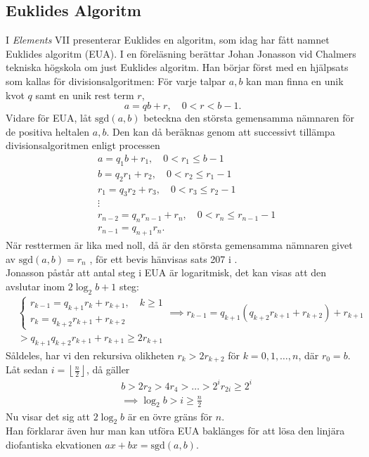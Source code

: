 \subsection*{Euklides Algoritm}
I \textit{Elements} VII presenterar Euklides en algoritm, som idag har fått namnet Euklides algoritm (EUA). I en föreläsning berättar Johan Jonasson vid Chalmers tekniska högskola om just Euklides algoritm. Han börjar först med en hjälpsats som kallas för divisionsalgoritmen:
För varje talpar $a,b$ kan man finna en unik kvot $q$ samt en unik rest term $r$, 
$$a=qb+r, \quad 0<r<b-1.$$
Vidare för EUA, låt $\text{sgd}{(a,b)}$ beteckna den största gemensamma nämnaren för de positiva heltalen $a,b$. 
Den kan då beräknas genom att successivt tillämpa divisionsalgoritmen enligt processen
\begin{align*}
	&a=q_1b+r_1,\quad 0<r_1\leq b-1\\
	&b=q_2r_1+r_2,\quad 0<r_2\leq r_1-1\\
	&r_1=q_3r_2+r_3,\quad 0<r_3\leq r_2-1\\
	&\vdots\\
	&r_{n-2}=q_nr_{n-1}+r_n,\quad 0<r_n\leq r_{n-1}-1\\
	&r_{n-1}=q_{n+1}r_n.
\end{align*}
När resttermen är lika med noll, då är den största gemensamma nämnaren givet av $\text{sgd}{(a,b)}=r_n$ \cite{talteori1}, för ett bevis hänvisas sats 207 i \cite{hardy}.\\
\iftrue
\noindent
Jonasson påstår att antal steg i EUA är logaritmisk, det kan visas att den avslutar inom $2\log_2{b}+1$ steg:
\begin{align*}
&\begin{cases}
	r_{k-1}=q_{k+1}r_{k}+r_{k+1},\quad k\geq 1\\
	r_k=q_{k+2}r_{k+1}+r_{k+2}
\end{cases}
\implies r_{k-1}=q_{k+1}(q_{k+2}r_{k+1}+r_{k+2})+r_{k+1}\\
&>q_{k+1}q_{k+2}r_{k+1}+r_{k+1}\geq 2r_{k+1}
\end{align*}
Såldeles, har vi den rekursiva olikheten $r_k>2r_{k+2}$ för $k=0,1,\ldots,n$, där $r_0=b$. Låt sedan $i=\left\lfloor\frac{n}{2}\right\rfloor$, då gäller
\begin{align*}
	&b>2r_2>4r_4>\ldots>2^ir_{2i}\geq2^i\\
	&\implies \log_2{b}>i\geq \frac{n}{2}
\end{align*}
Nu visar det sig att $2\log_2b$ är en övre gräns för $n$.\\
\fi
Han förklarar även hur man kan utföra EUA baklänges för att lösa den linjära diofantiska ekvationen $ax+bx=\text{sgd}{(a,b)}$.

